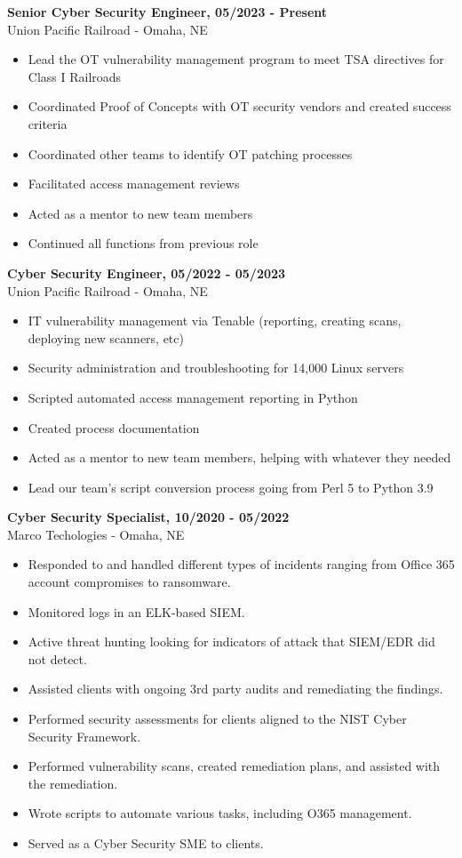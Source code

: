 \documentclass[a4paper,10pt]{article}
\begin{document}
\textbf{Senior Cyber Security Engineer, 05/2023 - Present} \\
Union Pacific Railroad - Omaha, NE
\begin{itemize}
    \small
    \leftskip=4em
    \item Lead the OT vulnerability management program to meet TSA directives for Class I Railroads
    \item Coordinated Proof of Concepts with OT security vendors and created success criteria
    \item Coordinated other teams to identify OT patching processes
    \item Facilitated access management reviews
    \item Acted as a mentor to new team members
    \item Continued all functions from previous role
\end{itemize}
\textbf{Cyber Security Engineer, 05/2022 - 05/2023} \\
Union Pacific Railroad - Omaha, NE
\begin{itemize}
    \small
    \leftskip=4em
    \item IT vulnerability management via Tenable (reporting, creating scans, deploying new scanners, etc)
    \item Security administration and troubleshooting for 14,000 Linux servers
    \item Scripted automated access management reporting in Python
    \item Created process documentation
    \item Acted as a mentor to new team members, helping with whatever they needed
    \item Lead our team's script conversion process going from Perl 5 to Python 3.9
\end{itemize}
\textbf{Cyber Security Specialist, 10/2020 - 05/2022} \\
Marco Techologies - Omaha, NE
\begin{itemize}
    \small
    \leftskip=4em
    \item Responded to and handled different types of incidents ranging from Office 365 account compromises to ransomware.
    \item Monitored logs in an ELK-based SIEM.
    \item Active threat hunting looking for indicators of attack that SIEM/EDR did not detect.
    \item Assisted clients with ongoing 3rd party audits and remediating the findings.
    \item Performed security assessments for clients aligned to the NIST Cyber Security Framework.
    \item Performed vulnerability scans, created remediation plans, and assisted with the remediation.
    \item Wrote scripts to automate various tasks, including O365 management.
    \item Served as a Cyber Security SME to clients.
\end{itemize}
\end{document}
